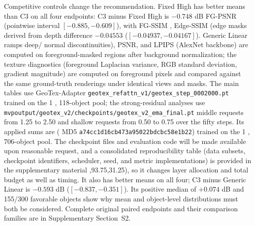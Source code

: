 \documentclass[times,twocolumn,final]{elsarticle}
\providecommand{\DIFadd}[1]{{\protect\color{blue} \sf #1}} %
\providecommand{\DIFdel}[1]{{\protect\color{red} \scriptsize #1}} %
\providecommand{\DIFaddbegin}{} %
\providecommand{\DIFaddend}{} %
\providecommand{\DIFdelbegin}{} %
\providecommand{\DIFdelend}{} %
\begin{document}
\DIFadd{Competitive controls change the recommendation. Fixed High has better means than C3 on all four endpoints: C3 minus Fixed High is $-0.748$ dB FG-PSNR (pointwise interval $[-0.885,-0.609]$), with }\DIFaddend FG-SSIM \DIFdelbegin \DIFdel{, Edge-SSIM (edge masks derived from depth}\DIFdelend \DIFaddbegin \DIFadd{difference $-0.04553$ ($[-0.04937,-0.04167]$). Generic Linear ramps deep}\DIFaddend /\DIFdelbegin \DIFdel{normal discontinuities), PSNR, and LPIPS (AlexNet backbone) are computed on foreground-masked regions after background normalization; the texture diagnostics (foreground Laplacian variance, RGB standard deviation, gradient magnitude) are computed on foreground pixels and compared against the same ground-truth renderings under identical views and masks. The main tables use GeoTex-Adapter \texttt{geotex\_refattn\_v1/geotex\_step\_0002000.pt} trained on the 1}%
\DIFdel{, }%
\DIFdel{118-object pool; the strong-residual analyses use \texttt{mvpoutput/geotex\_v2/checkpoints/geotex\_v2\_ema\_final.pt} }\DIFdelend \DIFaddbegin \DIFadd{middle requests from 1.25 to 2.50 and shallow requests from 0.50 to 0.75 over the fifty steps. Its applied sums are }\DIFaddend (\DIFdelbegin \DIFdel{MD5 \texttt{a74cc1d16cb473a95022bdcbc58e1b22}) trained on the 1}%
\DIFdel{, }%
\DIFdel{706-object pool. The checkpoint files and evaluation code will be made available upon reasonable request, and a consolidated reproducibility table (data subsets, checkpoint identifiers, scheduler, seed, and metric implementations) is provided in the supplementary material }\DIFdelend \DIFaddbegin \DIFadd{93.75,93.75,31.25), so it changes layer allocation and total budget as well as timing. It also has better means on all four; C3 minus Generic Linear is $-0.593$ dB ($[-0.837,-0.351]$). Its positive median of $+0.074$ dB and 155/300 favorable objects show why mean and object-level distributions must both be considered. Complete original paired endpoints and their comparison families are in Supplementary Section~S2}\DIFaddend .
\end{document}
